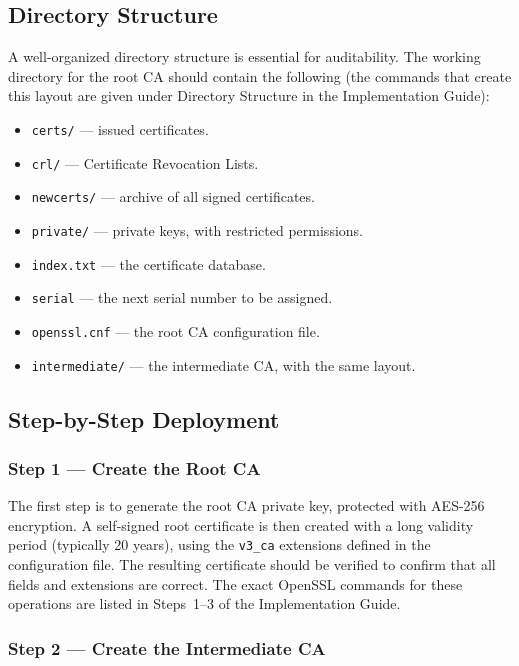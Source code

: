 \documentclass[10pt,twocolumn]{article}
\newcommand{\IGbase}{https://github.com/willLeckyThom/NetworkSecurity/blob/main/Projet/certificate_chain.md}
\newif\ifIGhref
\newcommand{\IGdoc}[1]{\ifIGhref\href{\IGbase}{#1}\else#1\fi}%
\newcommand{\IGstep}[2]{\ifIGhref\href{\IGbase\##1}{#2}\else#2\fi}%
\begin{document}
\subsection{Directory Structure}

A well-organized directory structure is essential for auditability. The
working directory for the root CA should contain the following (the commands
that create this layout are given under \IGstep{directory-structure}{Directory
Structure} in the \IGdoc{Implementation Guide}):

\begin{itemize}
  \item \texttt{certs/} --- issued certificates.
  \item \texttt{crl/} --- Certificate Revocation Lists.
  \item \texttt{newcerts/} --- archive of all signed certificates.
  \item \texttt{private/} --- private keys, with restricted permissions.
  \item \texttt{index.txt} --- the certificate database.
  \item \texttt{serial} --- the next serial number to be assigned.
  \item \texttt{openssl.cnf} --- the root CA configuration file.
  \item \texttt{intermediate/} --- the intermediate CA, with the same layout.
\end{itemize}

\subsection{Step-by-Step Deployment}

\subsubsection{Step 1 --- Create the Root CA}

The first step is to generate the root CA private key, protected with
AES-256 encryption. A self-signed root certificate is then created with a
long validity period (typically 20 years), using the \texttt{v3\_ca}
extensions defined in the configuration file. The resulting certificate
should be verified to confirm that all fields and extensions are correct.
The exact OpenSSL commands for these operations are listed in
\IGstep{step-1-configure-the-root-ca}{Steps~1--3 of the Implementation Guide}.

\subsubsection{Step 2 --- Create the Intermediate CA}
\end{document}
